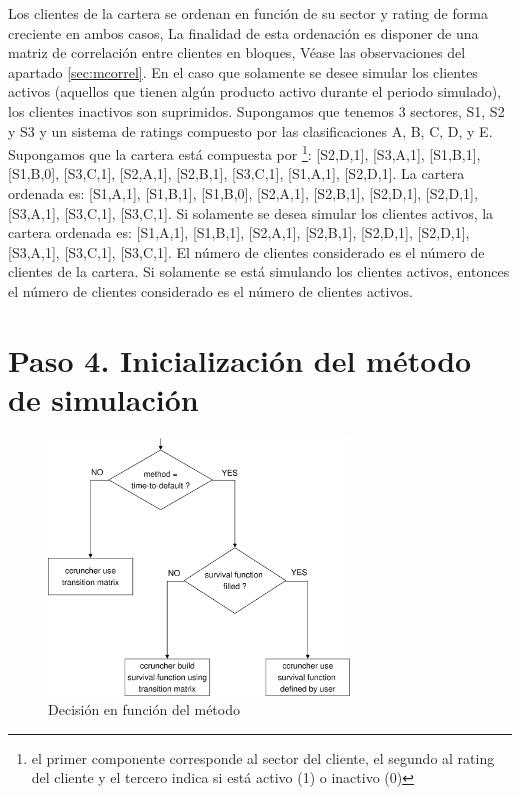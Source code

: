Los clientes de la cartera se ordenan en funci\'on de su sector
y rating de forma creciente en ambos casos, La finalidad de esta
ordenaci\'on es disponer de una matriz de correlaci\'on entre
clientes en bloques, V\'ease las observaciones del apartado \ref{sec:mcorrel}.
En el caso que solamente se desee simular los clientes activos (aquellos que
tienen alg\'un producto activo durante el periodo simulado), los clientes
inactivos son suprimidos.
\newline
\newline
Supongamos que tenemos 3 sectores, S1, S2 y S3 y un sistema de
ratings compuesto por las clasificaciones A, B, C, D, y E.
Supongamos que la cartera est\'a compuesta por \footnote{el
primer componente corresponde al sector del cliente, el segundo al
rating del cliente y el tercero indica si est\'a activo (1) o inactivo (0)}:
[S2,D,1], [S3,A,1], [S1,B,1], [S1,B,0], [S3,C,1], [S2,A,1], [S2,B,1], [S3,C,1],
[S1,A,1], [S2,D,1].
\newline
\newline
La cartera ordenada es:
[S1,A,1], [S1,B,1], [S1,B,0], [S2,A,1], [S2,B,1], [S2,D,1], [S2,D,1],
[S3,A,1], [S3,C,1], [S3,C,1].
\newline
\newline
Si solamente se desea simular los clientes activos, la cartera ordenada es:
[S1,A,1], [S1,B,1], [S2,A,1], [S2,B,1], [S2,D,1], [S2,D,1], [S3,A,1],
[S3,C,1], [S3,C,1].
\newline
\newline
El n\'umero de clientes considerado es el n\'umero de clientes de la cartera.
Si solamente se est\'a simulando los clientes activos, entonces el n\'umero
de clientes considerado es el n\'umero de clientes activos.


\section{Paso 4. Inicializaci\'on del m\'etodo de simulaci\'on}

\begin{figure}[!hb]
\begin{center}
\includegraphics[width=8cm,angle=0]{./images/decisiontree1.eps}
\caption{Decisi\'on en funci\'on del m\'etodo}
\label{decisiontree1}
\end{center}
\end{figure}

